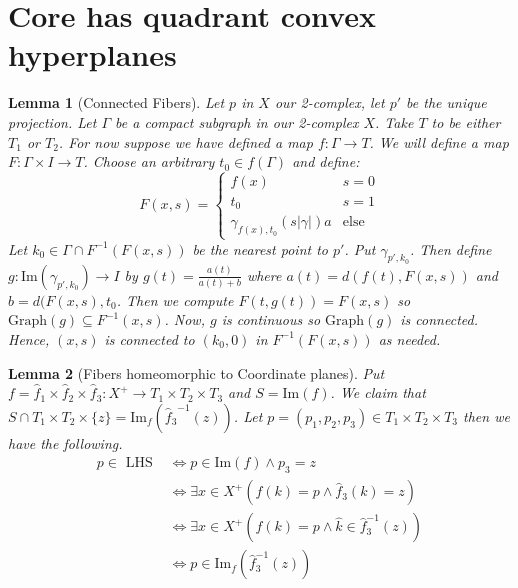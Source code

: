 \documentclass{article}
\theoremstyle{mystyle}
\newtheorem{lem}{Lemma}[section]
\theoremstyle{remark}
\begin{document}
\section{Core has quadrant convex hyperplanes}

\begin{lem}
    [Connected Fibers]
    Let \(p\) in \(X\) our 2-complex, let \(p'\) be the unique projection. Let \(\Gamma\) be a compact subgraph in our 2-complex \(X\).  Take \(T\) to be either \(T_{1}\) or \(T_{2}\). For now suppose we have defined a map \(f: \Gamma \to T\). We will define a map \(F: \Gamma \times I \to T\). Choose an arbitrary \(t_{0} \in f(\Gamma) \) and define: 
    \[ F(x,s) = 
        \begin{cases} 
            f(x)& s=0\\ 
            t_{0} & s=1\\
            \gamma_{f(x),t_{0}} (s | \gamma |)a & \text{else}
        \end{cases}
    \]
    Let \(k_{0} \in \Gamma \cap F^{-1} (F(x,s))\) be the nearest point to \(p'\). Put \(\gamma_{p',k_{0}}\). Then define \(g: \text{Im} (\gamma_{p',k_{0}}) \to I\) by \(g(t) = \frac{a(t)}{a(t)+b}\) where \(a(t) = d(f(t), F(x,s))\) and \(b = d(F(x,s), t_{0}\). Then we compute \(F(t,g(t))=F(x,s)\) so \(\text{Graph}(g) \subseteq F^{-1} (x,s)\). Now, \(g\) is continuous so \(\text{Graph}(g)\) is connected. Hence, \((x,s)\) is connected to \((k_{0} ,0)\) in \(F^{-1} (F(x,s))\) as needed.
\end{lem}
\begin{lem}
    [Fibers homeomorphic to Coordinate planes]
    Put \(f = \hat f_{1} \times \hat f_{2} \times \hat f_{3}: X^{+} \to T_{1} \times T_{2} \times T_{3} \) and \(S = \text{Im}(f)\). We claim that \(S \cap T_{1} \times T_{2} \times \{z\} = \text{Im}_{f} ({\hat f_{3}}^{-1}(z))\). Let \(p = (p_{1}, p_{2} , p_{3}) \in T_{1} \times T_{2} \times T_{3}\) then we have the following. 
    \begin{align*}
        p \in \text { LHS } & \Longleftrightarrow p \in \text{Im}(f) \wedge p_{3} = z \\ 
        & \Longleftrightarrow \exists x \in X^{+} (f(k)=p \wedge \hat f_3(k)=z)\\
        & \Longleftrightarrow \exists x \in X^{+} (f(k)=p \wedge \hat k \in \hat f_3^{-1} (z))\\
        & \Longleftrightarrow p \in \text{Im}_f(\hat f_3^{-1} (z))
    \end{align*}
\end{lem}
\end{document}
